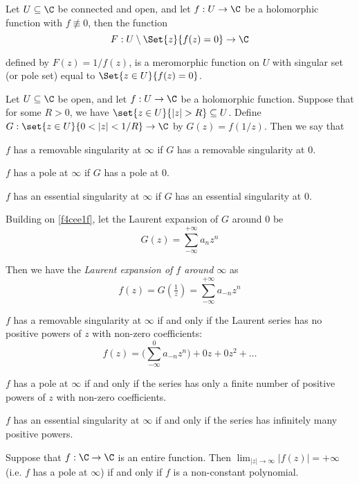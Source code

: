 \label{e672e2a}

Let $U\subseteq\C$ be connected and open, and let $f:U\to\C$ be a holomorphic
function with $f\not\equiv0$, then the function
$$
  F:U\setminus\Set{z}{f(z)=0}\to\C
$$

defined by $F(z)=1/f(z)$, is a meromorphic function on $U$ with singular set
(or pole set) equal to $\Set{z\in U}{f(z)=0}$.

\Definition{}\label{f4cee1f}

Let $U\subseteq\C$ be open, and let $f:U\to\C$ be a holomorphic function.
Suppose that for some $R>0$, we have $\set{z\in U}{|z|>R}\subseteq U$. Define
$G:\set{z\in U}{0<|z|<1/R}\to\C$ by $G(z)=f(1/z)$. Then we say that
\begin{enumerati}
  \item $f$ has a removable singularity at $\infty$ if $G$ has a removable
  singularity at $0$.
  \item $f$ has a pole at $\infty$ if $G$ has a pole at $0$.
  \item $f$ has an essential singularity at $\infty$ if $G$ has an essential
  singularity at $0$.
\end{enumerati}

\label{eb529b9}

Building on \autoref{f4cee1f}, let the Laurent expansion of $G$ around $0$ be
$$
  G(z)=\sum_{-\infty}^{+\infty}a_nz^n
$$

Then we have the \textit{Laurent expansion of $f$ around $\infty$} as
$$
  f(z)=G(\tfrac1z)=\sum_{-\infty}^{+\infty}a_{-n}z^n
$$

\begin{enumerati}
  \item $f$ has a removable singularity at $\infty$ if and only if the Laurent
  series has no positive powers of $z$ with non-zero coefficients:
  $$
    f(z)=\biggl(\sum_{-\infty}^0a_{-n}z^n\biggr)+0z+0z^2+\ldots
  $$
  \item $f$ has a pole at $\infty$ if and only if the series has only a finite
  number of positive powers of $z$ with non-zero coefficients.
  \item $f$ has an essential singularity at $\infty $ if and only if the series
  has infinitely many positive powers.
\end{enumerati}

\Theorem{}\label{cabe102}

Suppose that $f:\C\to\C$ is an entire function. Then
$\lim_{|z|\to\infty}|f(z)|=+\infty$ (i.e. $f$ has a pole at $\infty$) if and
only if $f$ is a non-constant polynomial.


